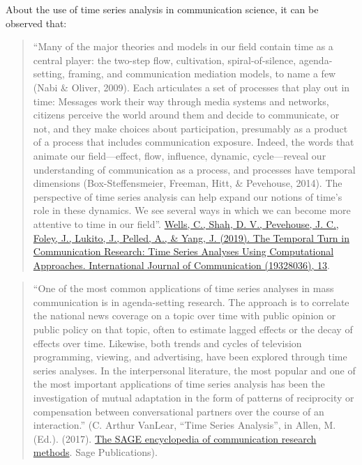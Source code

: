 \documentclass[
]{article}
\begin{document}
About the use of time series analysis in communication science, it can be observed that:

\begin{quote}
``Many of the major theories and models in our field contain time as a central player: the two-step flow, cultivation, spiral-of-silence, agenda-setting, framing, and communication mediation models, to name a few (Nabi \& Oliver, 2009). Each articulates a set of processes that play out in time: Messages work their way through media systems and networks, citizens perceive the world around them and decide to communicate, or not, and they make choices about participation, presumably as a product of a process that includes communication exposure. Indeed, the words that animate our field---effect, flow, influence, dynamic, cycle---reveal our understanding of communication as a process, and processes have temporal dimensions (Box-Steffensmeier, Freeman, Hitt, \& Pevehouse, 2014). The perspective of time series analysis can help expand our notions of time's role in these dynamics. We see several ways in which we can become more attentive to time in our field''. \href{https://ijoc.org/index.php/ijoc/article/view/10635}{Wells, C., Shah, D. V., Pevehouse, J. C., Foley, J., Lukito, J., Pelled, A., \& Yang, J. (2019). The Temporal Turn in Communication Research: Time Series Analyses Using Computational Approaches. International Journal of Communication (19328036), 13}.
\end{quote}

\begin{quote}
``One of the most common applications of time series analyses in mass communication is in agenda-setting research. The approach is to correlate the national news coverage on a topic over time with public opinion or public policy on that topic, often to estimate lagged effects or the decay of effects over time. Likewise, both trends and cycles of television programming, viewing, and advertising, have been explored through time series analyses. In the interpersonal literature, the most popular and one of the most important applications of time series analysis has been the investigation of mutual adaptation in the form of patterns of reciprocity or compensation between conversational partners over the course of an interaction.'' (C. Arthur VanLear, ``Time Series Analysis'', in Allen, M. (Ed.). (2017). \href{https://us.sagepub.com/en-us/nam/the-sage-encyclopedia-of-communication-research-methods/book244974}{The SAGE encyclopedia of communication research methods}. Sage Publications).
\end{quote}
\end{document}
